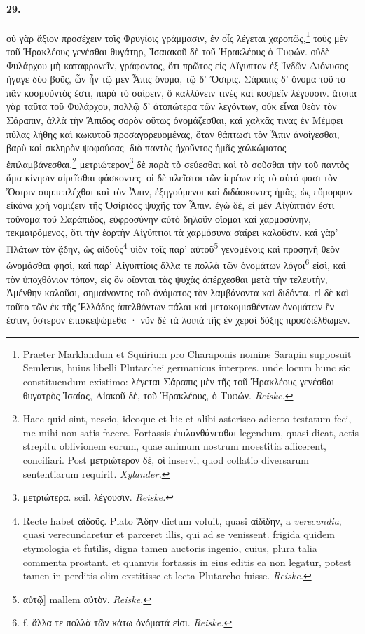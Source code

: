\documentclass[a4paper, 11pt, oneside, polutonikogreek, german, landscape]{article}
\begin{document}
\paragraph{29.}
οὐ γὰρ ἄξιον προσέχειν τοῖς Φρυγίοις γράμμασιν, ἐν οἷς λέγεται χαροπῶς,\footnote{Praeter Marklandum et Squirium pro Charaponis nomine Sarapin supposuit Semlerus, huius libelli Plutarchei germanicus interpres. unde locum hunc sic constituendum existimo: λέγεται Σάραπις μὲν τῆς τοῦ Ἡρακλέους γενέσθαι θυγατρὸς Ἰσαίας, Αἰακοῦ δὲ, τοῦ Ἡρακλέους, ὁ Τυφών. \emph{Reiske.}} τοὺς μὲν τοῦ Ἡρακλέους γενέσθαι θυγάτηρ, Ἰσαιακοῦ δὲ τοῦ Ἡρακλέους ὁ Τυφών. οὐδὲ Φυλάρχου μὴ καταφρονεῖν, γράφοντος, ὅτι πρῶτος εἰς Αἴγυπτον ἐξ Ἰνδῶν Διόνυσος ἤγαγε δύο βοῦς, ὧν ἦν τῷ μὲν Ἆπις ὄνομα, τῷ δ' Ὄσιρις. Σάραπις δ' ὄνομα τοῦ τὸ πᾶν κοσμοῦντός ἐστι, παρὰ τὸ σαίρειν, ὃ καλλύνειν τινὲς καὶ κοσμεῖν λέγουσιν. ἄτοπα γὰρ ταῦτα τοῦ Φυλάρχου, πολλῷ δ' ἀτοπώτερα τῶν λεγόντων, οὐκ εἶναι θεὸν τὸν Σάραπιν, ἀλλὰ τὴν Ἄπιδος σορὸν οὕτως ὀνομάζεσθαι, καὶ χαλκᾶς τινας ἐν Μέμφει πύλας λήθης καὶ κωκυτοῦ προσαγορευομένας, ὅταν θάπτωσι τὸν Ἆπιν ἀνοίγεσθαι, βαρὺ καὶ σκληρὸν ψοφούσας. διὸ παντὸς ἠχοῦντος ἡμᾶς χαλκώματος ἐπιλαμβάνεσθαι,\footnote{Haec quid sint, nescio, ideoque et hic et alibi asterisco adiecto testatum feci, me mihi non satis facere. Fortassis ἐπιλανθάνεσθαι legendum, quasi dicat, aetis strepitu oblivionem eorum, quae animum nostrum moestitia afficerent, conciliari. Post μετριώτερον δὲ, οἱ inservi, quod collatio diversarum sententiarum requirit. \emph{Xylander.}} μετριώτερον\footnote{μετριώτερα. scil. λέγουσιν. \emph{Reiske.}} δὲ παρὰ τὸ σεύεσθαι καὶ τὸ σοῦσθαι τὴν τοῦ παντὸς ἅμα κίνησιν αἱρεῖσθαι φάσκοντες. οἱ δὲ πλεῖστοι τῶν ἱερέων εἰς τὸ αὐτό φασι τὸν Ὄσιριν συμπεπλέχθαι καὶ τὸν Ἆπιν, ἐξηγούμενοι καὶ διδάσκοντες ἡμᾶς, ὡς εὔμορφον εἰκόνα χρὴ νομίζειν τῆς Ὀσίριδος ψυχῆς τὸν Ἆπιν. ἐγὼ δὲ, εἰ μὲν Αἰγύπτιόν ἐστι τοὔνομα τοῦ Σαράπιδος, εὐφροσύνην αὐτὸ δηλοῦν οἴομαι καὶ χαρμοσύνην, τεκμαιρόμενος, ὅτι τὴν ἑορτὴν Αἰγύπτιοι τὰ χαρμόσυνα σαίρει καλοῦσιν. καὶ γὰρ' Πλάτων τὸν ᾅδην, ὡς αἰδοῦς\footnote{Recte habet αἰδοῦς. Plato Ἅδην dictum voluit, quasi αἰδίδην, a \emph{verecundia}, quasi verecundaretur et parceret illis, qui ad se venissent. frigida quidem etymologia et futilis, digna tamen auctoris ingenio, cuius, plura talia commenta prostant. et quamvis fortassis in eius editis ea non legatur, potest tamen in perditis olim exstitisse et lecta Plutarcho fuisse. \emph{Reiske.}} υἱὸν τοῖς παρ' αὐτοῦ\footnote{αὐτῷ] mallem αὐτὸν. \emph{Reiske.}} γενομένοις καὶ προσηνῆ θεὸν ὠνομάσθαι φησὶ, καὶ παρ' Αἰγυπτίοις ἄλλα τε πολλὰ τῶν ὀνομάτων λόγοι\footnote{f. ἄλλα τε πολλὰ τῶν κάτω ὀνόματά εἰσι. \emph{Reiske.}} εἰσὶ, καὶ τὸν ὑποχθόνιον τόπον, εἰς ὃν οἴονται τὰς ψυχὰς ἀπέρχεσθαι μετὰ τὴν τελευτὴν, Ἀμένθην καλοῦσι, σημαίνοντος τοῦ ὀνόματος τὸν λαμβάνοντα καὶ διδόντα. εἰ δὲ καὶ τοῦτο τῶν ἐκ τῆς Ἑλλάδος ἀπελθόντων πάλαι καὶ μετακομισθέντων ὀνομάτων ἕν ἐστιν, ὕστερον ἐπισκεψώμεθα · νῦν δὲ τὰ λοιπὰ τῆς ἐν χερσὶ δόξης προσδιέλθωμεν.
\end{document}
